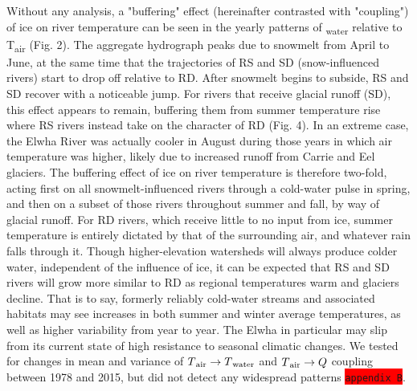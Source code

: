 \documentclass{article}
\begin{document}
Without any analysis, a "buffering" effect (hereinafter contrasted with "coupling") of ice on river temperature can be seen in the yearly patterns of \textsubscript{water} relative to T\textsubscript{air} (Fig. 2). The aggregate hydrograph peaks due to snowmelt from April to June, at the same time that the trajectories of RS and SD (snow-influenced rivers) start to drop off relative to RD. After snowmelt begins to subside, RS and SD recover with a noticeable jump. For rivers that receive glacial runoff (SD), this effect appears to remain, buffering them from summer temperature rise where RS rivers instead take on the character of RD (Fig. 4). In an extreme case, the Elwha River was actually cooler in August during those years in which air temperature was higher, likely due to increased runoff from Carrie and Eel glaciers. The buffering effect of ice on river temperature is therefore two-fold, acting first on all snowmelt-influenced rivers through a cold-water pulse in spring, and then on a subset of those rivers throughout summer and fall, by way of glacial runoff. For RD rivers, which receive little to no input from ice, summer temperature is entirely dictated by that of the surrounding air, and whatever rain falls through it. Though higher-elevation watersheds will always produce colder water, independent of the influence of ice, it can be expected that RS and SD rivers will grow more similar to RD as regional temperatures warm and glaciers decline. That is to say, formerly reliably cold-water streams and associated habitats may see increases in both summer and winter average temperatures, as well as higher variability from year to year. The Elwha in particular may slip from its current state of high resistance to seasonal climatic changes. We tested for changes in mean and variance of $T\textsubscript{air}\rightarrow T\textsubscript{water}$ and $T\textsubscript{air}\rightarrow Q$ coupling between 1978 and 2015, but did not detect any widespread patterns \colorbox{red}{\lstinline{appendix B}}.
\end{document}
